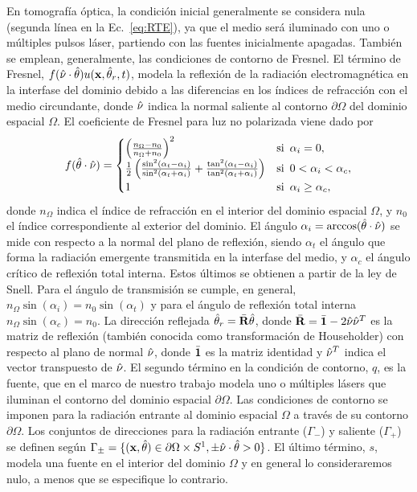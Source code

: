 En tomografía óptica, la condición inicial generalmente se considera nula 
(segunda línea en la Ec.~\eqref{eq:RTE}), ya 
que el medio será iluminado con uno o múltiples pulsos láser, partiendo con las 
fuentes inicialmente apagadas. 
También se emplean, generalmente, las condiciones de contorno de Fresnel. 
El término de Fresnel, $f(\hat{\nu} \cdot \hat{\theta}) u(\mathbf{x},\hat{\theta}_r,t)$, 
modela la reflexión de la radiación electromagnética 
en la interfase del dominio  debido a las diferencias en los índices de refracción 
con el medio circundante, 
donde $\hat{\nu}$ indica la normal saliente al contorno $\partial \Omega$ del dominio espacial 
$\Omega$. 
El coeficiente de Fresnel para luz no polarizada viene dado por~\cite{Born1999}
\begin{equation}
f(\hat{\theta} \cdot \hat{\nu}) =
     \begin{cases}
      \left( \frac{n_{\Omega}-n_0}{n_{\Omega}+n_0} \right)^2  & \text{si~} \, \alpha_i = 0, \\
       \frac{1}{2}\left(\frac{\sin^2(\alpha_t-\alpha_i)}{\sin^2(\alpha_t+
       \alpha_i)}+\frac{\tan^2(\alpha_t-\alpha_i)}{\tan^2(\alpha_t+\alpha_i)}\right) & 
       \text{si~} \, 0<\alpha_i < \alpha_c, \\
      1  & \text{si~} \, \alpha_i \ge \alpha_c, \\
     \end{cases}
     \label{eq:Fresnel}
\end{equation}
donde $n_\Omega$ indica  el índice de refracción en el interior 
del dominio espacial $\Omega$, y $n_0$ el índice correspondiente al exterior del dominio. El ángulo $\alpha_i=\arccos(\hat{\theta} \cdot \hat{\nu})$ 
se mide con respecto a la normal del plano de reflexión, siendo $\alpha_t$ 
el ángulo que forma la radiación emergente transmitida en la interfase del medio, y $\alpha_c$ el ángulo 
crítico de reflexión total interna. Estos últimos se obtienen a partir de la ley de Snell. 
Para el ángulo de transmisión se cumple, en general, $n_{\Omega} \sin(\alpha_i)=n_0 \sin (\alpha_t)$ y para el  
ángulo de reflexión total interna $n_{\Omega} \sin(\alpha_c)=n_0$.
La dirección reflejada $\hat{\theta}_r=\bar{\mathbf{R}} \hat{\theta}$, donde $\bar{\mathbf{R}} =\bar{\mathbf{1}}-2\hat{\nu} \hat{\nu}^T$ es la matriz de reflexión 
(también conocida como transformación de Householder) con respecto al plano de normal $\hat{\nu}$, donde $\bar{\mathbf{1}}$ 
es la matriz identidad y $\hat{\nu}^T$ 
indica el vector transpuesto de $\hat{\nu}$.   El 
segundo término en la condición de contorno, $q$, es la fuente, que en el marco de nuestro trabajo  
modela uno o múltiples lásers que iluminan el contorno del dominio espacial $\partial \Omega$. 
Las condiciones de contorno se imponen para la radiación entrante 
al dominio espacial $\Omega$ a través de su contorno $\partial \Omega$. 
Los conjuntos de direcciones para la radiación entrante ($\Gamma_-$) y saliente ($\Gamma_+$) 
se definen según $\Gamma_{\pm}=\{(\mathbf{x},\hat{\theta}) \in \partial \Omega \times S^1, 
\pm \hat \nu \cdot \hat{\theta} >0 \}$. 
El último término, $s$, modela una fuente en el interior 
del dominio $\Omega$ y en general lo consideraremos nulo, a menos 
que se especifique lo contrario. 

